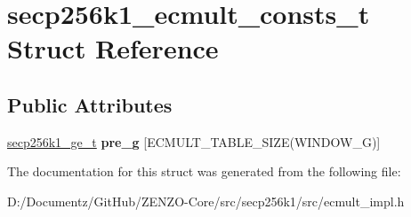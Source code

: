 \hypertarget{structsecp256k1__ecmult__consts__t}{}\section{secp256k1\+\_\+ecmult\+\_\+consts\+\_\+t Struct Reference}
\label{structsecp256k1__ecmult__consts__t}
\subsection*{Public Attributes}
\begin{DoxyCompactItemize}
\item 
\mbox{\label{structsecp256k1__ecmult__consts__t_a1c99ab4df9ca761b602aaea5cfe71dae}} 
\mbox{\hyperlink{structsecp256k1__ge__t}{secp256k1\+\_\+ge\+\_\+t}} {\bfseries pre\+\_\+g} \mbox{[}E\+C\+M\+U\+L\+T\+\_\+\+T\+A\+B\+L\+E\+\_\+\+S\+I\+ZE(W\+I\+N\+D\+O\+W\+\_\+G)\mbox{]}
\end{DoxyCompactItemize}


The documentation for this struct was generated from the following file\+:\begin{DoxyCompactItemize}
\item 
D\+:/\+Documentz/\+Git\+Hub/\+Z\+E\+N\+Z\+O-\/\+Core/src/secp256k1/src/ecmult\+\_\+impl.\+h\end{DoxyCompactItemize}

